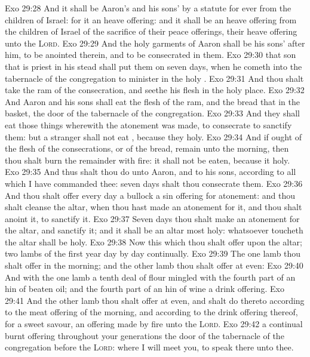 \vs Exo 29:28 And it shall be Aaron's and his sons' by a statute for ever from the children of Israel: for it  an heave offering: and it shall be an heave offering from the children of Israel of the sacrifice of their peace offerings,  their heave offering unto the \textsc{Lord}.
\vs Exo 29:29 And the holy garments of Aaron shall be his sons' after him, to be anointed therein, and to be consecrated in them.
\vs Exo 29:30  that son that is priest in his stead shall put them on seven days, when he cometh into the tabernacle of the congregation to minister in the holy .
\vs Exo 29:31 And thou shalt take the ram of the consecration, and seethe his flesh in the holy place.
\vs Exo 29:32 And Aaron and his sons shall eat the flesh of the ram, and the bread that  in the basket,  the door of the tabernacle of the congregation.
\vs Exo 29:33 And they shall eat those things wherewith the atonement was made, to consecrate  to sanctify them: but a stranger shall not eat , because they  holy.
\vs Exo 29:34 And if ought of the flesh of the consecrations, or of the bread, remain unto the morning, then thou shalt burn the remainder with fire: it shall not be eaten, because it  holy.
\vs Exo 29:35 And thus shalt thou do unto Aaron, and to his sons, according to all  which I have commanded thee: seven days shalt thou consecrate them.
\vs Exo 29:36 And thou shalt offer every day a bullock  a sin offering for atonement: and thou shalt cleanse the altar, when thou hast made an atonement for it, and thou shalt anoint it, to sanctify it.
\vs Exo 29:37 Seven days thou shalt make an atonement for the altar, and sanctify it; and it shall be an altar most holy: whatsoever toucheth the altar shall be holy.
\vs Exo 29:38 Now this  which thou shalt offer upon the altar; two lambs of the first year day by day continually.
\vs Exo 29:39 The one lamb thou shalt offer in the morning; and the other lamb thou shalt offer at even:
\vs Exo 29:40 And with the one lamb a tenth deal of flour mingled with the fourth part of an hin of beaten oil; and the fourth part of an hin of wine  a drink offering.
\vs Exo 29:41 And the other lamb thou shalt offer at even, and shalt do thereto according to the meat offering of the morning, and according to the drink offering thereof, for a sweet savour, an offering made by fire unto the \textsc{Lord}.
\vs Exo 29:42  a continual burnt offering throughout your generations  the door of the tabernacle of the congregation before the \textsc{Lord}: where I will meet you, to speak there unto thee.
